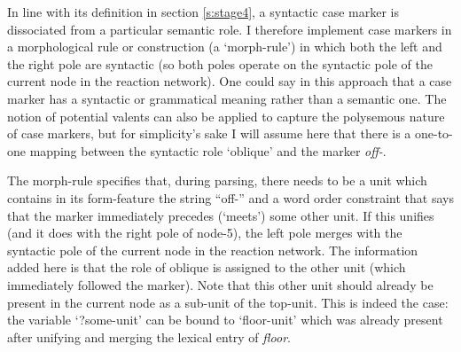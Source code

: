 In line with its definition in section \ref{s:stage4}, a syntactic case marker is dissociated from a particular semantic role. I therefore implement case markers in a morphological rule or construction (a `morph-rule') in which both the left and the right pole are syntactic (so both poles operate on the syntactic pole of the current node in the reaction network). One could say in this approach that a case marker has a syntactic or grammatical meaning rather than a semantic one. The notion of potential valents can also be applied to capture the polysemous nature of case markers, but for simplicity's sake I will assume here that there is a one-to-one mapping between the syntactic role `oblique' and the marker {\em off-}.

The morph-rule specifies that, during parsing, there needs to be a unit which contains in its form-feature the string ``off-'' and a word order constraint that says that the marker immediately precedes (`meets') some other unit. If this unifies (and it does with the right pole of node-5), the left pole merges with the syntactic pole of the current node in the reaction network. The information added here is that the role of oblique is assigned to the other unit (which immediately followed the marker). Note that this other unit should already be present in the current node as a sub-unit of the top-unit. This is indeed the case: the variable `?some-unit' can be bound to `floor-unit' which was already present after unifying and merging the lexical entry of {\em floor}.


